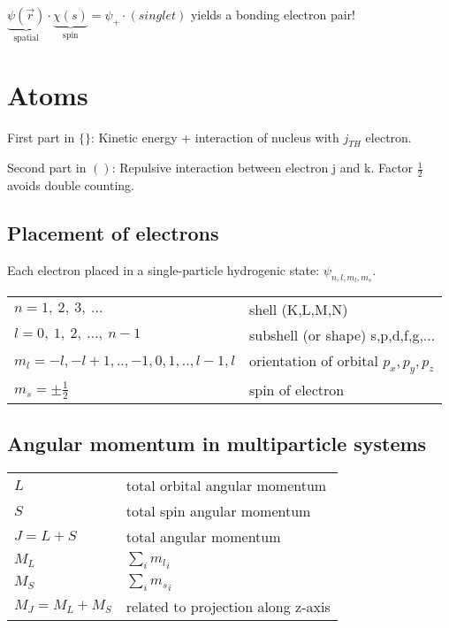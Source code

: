 \documentclass[10pt,a4paper]{scrartcl}
\begin{document}
\begin{multicols*}{3}
	$\underbrace{\psi(\vec{r})}_{\text{spatial}}\cdot\underbrace{\chi(s)}_{\text{spin}}=\psi_+\cdot(singlet)$ yields a bonding electron pair!
	
	\section{Atoms}
	
	
	First part in $\{\}$: Kinetic energy + interaction of nucleus with $j_{TH} $ electron.
	
	Second part in $\left(\right)$: Repulsive interaction between electron j and k. Factor $\frac{1}{2}$ avoids double counting.
	
	\subsection{Placement of electrons}
	
	Each electron placed in a single-particle hydrogenic state: $\psi_{n,l,m_l,m_s}$.
	
	\finn	
	
	\footnotesize
	\begin{tabular}{ll}
	$n=1,\ 2,\ 3,\ \dots$&shell (K,L,M,N)\\
	$l=0,\ 1,\ 2,\ \dots ,\ n-1$&subshell (or shape) s,p,d,f,g,$\ldots$\\
	$m_l=-l, -l+1, .. ,-1,0,1,..,l-1,l$ & orientation of orbital $p_x,p_y,p_z$\\
	$m_s=\pm\frac{1}{2}$&spin of electron
	\end{tabular}
	\normalsize
	
	
	
	
	\subsection{Angular momentum in multiparticle systems}
	
	\small
	\begin{tabular}{l@{ $\equiv$ }l}
	$L$& total orbital angular momentum\\
	$S$& total spin angular momentum\\
	$J = L + S$& total angular momentum\\
	$M_L$& $\sum_i{{m_l}_i}$\\
	$M_S$& $\sum_i{{m_s}_i}$\\
	$M_J=M_L+M_S$&related to projection along z-axis 
	\end{tabular}
	\normalsize		
	

\end{multicols*}
\end{document}
